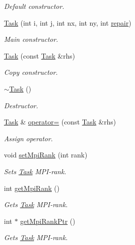 \begin{DoxyCompactItemize}
\begin{DoxyCompactList}\small\item\em Default constructor. \end{DoxyCompactList}\item 
\hyperlink{classTask_a18dc52e0d2bc784c2947142f04e92609}{Task} (int i, int j, int nx, int ny, int \hyperlink{classTask_ac84383a9682166e1b92d2b7f29c77aae}{repair})
\begin{DoxyCompactList}\small\item\em Main constructor. \end{DoxyCompactList}\item 
\hyperlink{classTask_af99394b6a5a7e57d9d5c12d45dd06133}{Task} (const \hyperlink{classTask}{Task} \&rhs)
\begin{DoxyCompactList}\small\item\em Copy constructor. \end{DoxyCompactList}\item 
\hyperlink{classTask_a3ecf499ea35fb4a96853969a1e1cbbce}{$\sim$\+Task} ()
\begin{DoxyCompactList}\small\item\em Destructor. \end{DoxyCompactList}\item 
\hyperlink{classTask}{Task} \& \hyperlink{classTask_a68f0c278427d5a75df6fd59505c59b9a}{operator=} (const \hyperlink{classTask}{Task} \&rhs)
\begin{DoxyCompactList}\small\item\em Assign operator. \end{DoxyCompactList}\item 
void \hyperlink{classTask_a3cffaff82f68529ae3f5bad0f3a8b0f9}{set\+Mpi\+Rank} (int rank)
\begin{DoxyCompactList}\small\item\em Sets \hyperlink{classTask}{Task} M\+P\+I-\/rank. \end{DoxyCompactList}\item 
int \hyperlink{classTask_a091eb01d0f1f213d76414aaad2481c5f}{get\+Mpi\+Rank} ()
\begin{DoxyCompactList}\small\item\em Gets \hyperlink{classTask}{Task} M\+P\+I-\/rank. \end{DoxyCompactList}\item 
int $\ast$ \hyperlink{classTask_afc97ef89f005275cc36c5802d355b182}{get\+Mpi\+Rank\+Ptr} ()
\begin{DoxyCompactList}\small\item\em Gets \hyperlink{classTask}{Task} M\+P\+I-\/rank. \end{DoxyCompactList}\item 

\end{DoxyCompactItemize}
